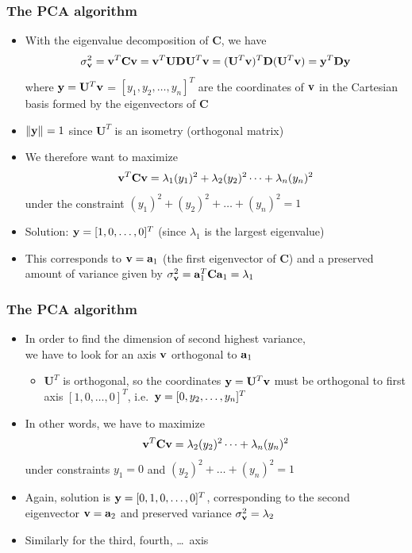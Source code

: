\begin{frame}
  \frametitle{The PCA algorithm}

  \begin{itemize}
  \item With the eigenvalue decomposition of $\mathbf{C}$, we have 
    \[
    \sigma_{\vv}^2 = \vv^T \mathbf{C} \vv 
    = \vv^T \mathbf{U} \mathbf{D} \mathbf{U}^T \vv 
    = (\mathbf{U}^T \vv)^T \mathbf{D} (\mathbf{U}^T \vv) 
    = \vy^T \mathbf{D} \vy
    \]
    where $\vy = \mathbf{U}^T \vv$ = $[y_1, y_2, \ldots, y_n]^T$ are the
    coordinates of $\vv$ in the Cartesian basis formed by the eigenvectors of
    $\mathbf{C}$
  \item<2-> $\norm{\vy} = 1$ since $\mathbf{U}^T$ is an isometry (orthogonal matrix)
  \item<2-> We therefore want to maximize 
    \[
    \vv^T \mathbf{C} \vv = \lambda_1 (y_1)^2 + \lambda_2 (y_2)^2 \dots + \lambda_n (y_n)^2
    \]
    under the constraint $(y_1)^2 + (y_2)^2 + \dots + (y_n)^2 = 1$
  \item<3-> Solution: $\vy = [1, 0, \dots, 0]^T$ (since $\lambda_1$ is the
    largest eigenvalue)
  \item<3-> This corresponds to $\vv = \va_1$ (the first eigenvector of
    $\mathbf{C}$) and a preserved amount of variance given by $\sigma_{\vv}^2
    = \va_1^T \mathbf{C} \va_1 = \lambda_1$
  \end{itemize}
\end{frame}

\begin{frame}
  \frametitle{The PCA algorithm}

  \begin{itemize}
  \item In order to find the dimension of second highest variance,\\
    we have to look for an axis $\vv$ orthogonal to $\va_1$
    \begin{itemize}
    \item[\hand] $\mathbf{U}^T$ is orthogonal, so the coordinates $\vy =
      \mathbf{U}^T \vv$ must be orthogonal to first axis $[1, 0, \dots, 0]^T$,
      i.e.\ $\vy = [0, y_2, \dots, y_n]^T$
    \end{itemize}
  \item<2-> In other words, we have to maximize
    \[
    \vv^T \mathbf{C} \vv = \lambda_2 (y_2)^2 \dots + \lambda_n (y_n)^2
    \]
    under constraints $y_1 = 0$ and $(y_2)^2 + \dots + (y_n)^2 = 1$
  \item<3-> Again, solution is $\vy = [0, 1, 0, \dots, 0]^T$, corresponding to the
    second eigenvector $\vv = \va_2$ and preserved variance $\sigma_{\vv}^2 =
    \lambda_2$
  \item<4-> Similarly for the third, fourth, \ldots\ axis
  \end{itemize}
\end{frame}


